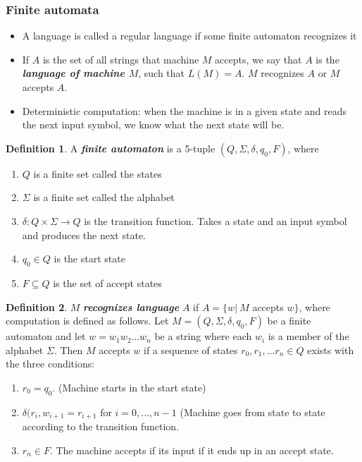 \documentclass[11pt]{article}
\theoremstyle{definition}
\newtheorem{defn}{Definition}[section]
\begin{document}
\subsubsection{Finite automata}
\begin{itemize}[leftmargin=*]
    \item A language is called a regular language if some finite automaton recognizes it
    \item If $A$ is the set of all strings that machine $M$ accepts, we say that $A$ is the \textbf{\textit{language of machine $M$}}, such that $L(M)=A$. $M$ recognizes $A$ or $M$ accepts $A$.
    \item Deterministic computation: when the machine is in a given state and reads the next input symbol, we know what the next state will be.
\end{itemize}
\begin{defn}
A \textbf{\textit{finite automaton}} is a 5-tuple $(Q,\Sigma, \delta, q_0, F)$, where
\begin{enumerate}
    \item $Q$ is a finite set called the states 
    \item $\Sigma$ is a finite set called the alphabet
    \item $\delta: Q\times\Sigma \longrightarrow Q$ is the transition function. Takes a state and an input symbol and produces the next state.
    \item $q_0 \in Q$ is the start state
    \item $F\subseteq Q$ is the set of accept states
\end{enumerate}
\end{defn}
\begin{defn}
$M$ \textbf{\textit{recognizes language}} $A$ if $A=\{w |\ M$ accepts $w\}$, where computation is defined as follows. Let $M = (Q,\Sigma, \delta, q_0,F)$ be a finite automaton and let $w=w_1w_2\ldots w_n$ be a string where each $w_i$ is a member of the alphabet $\Sigma$. Then $M$ accepts $w$ if a sequence of states $r_0,r_1,\ldots r_n \in Q$ exists with the three conditions:
\begin{enumerate}
    \item $r_0 = q_0$. (Machine starts in the start state) 
    \item $\delta(r_i, w_{i+1} = r_{i+1}$ for $i = 0, \ldots, n-1$ (Machine goes from state to state according to the transition function.
    \item $r_n \in F$. The machine accepts if its input if it ends up in an accept state.
\end{enumerate}
\end{defn}
\end{document}
